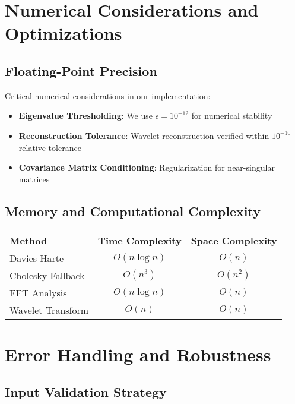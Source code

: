 \documentclass[11pt,a4paper]{article}
\begin{document}
\section{Numerical Considerations and Optimizations}

\subsection{Floating-Point Precision}

Critical numerical considerations in our implementation:

\begin{itemize}
    \item \textbf{Eigenvalue Thresholding}: We use $\epsilon = 10^{-12}$ for numerical stability
    \item \textbf{Reconstruction Tolerance}: Wavelet reconstruction verified within $10^{-10}$ relative tolerance
    \item \textbf{Covariance Matrix Conditioning}: Regularization for near-singular matrices
\end{itemize}

\subsection{Memory and Computational Complexity}

\begin{center}
\begin{tabular}{|l|c|c|}
\hline
\textbf{Method} & \textbf{Time Complexity} & \textbf{Space Complexity} \\
\hline
Davies-Harte & $O(n \log n)$ & $O(n)$ \\
Cholesky Fallback & $O(n^3)$ & $O(n^2)$ \\
FFT Analysis & $O(n \log n)$ & $O(n)$ \\
Wavelet Transform & $O(n)$ & $O(n)$ \\
\hline
\end{tabular}
\end{center}

\section{Error Handling and Robustness}

\subsection{Input Validation Strategy}
\end{document}
